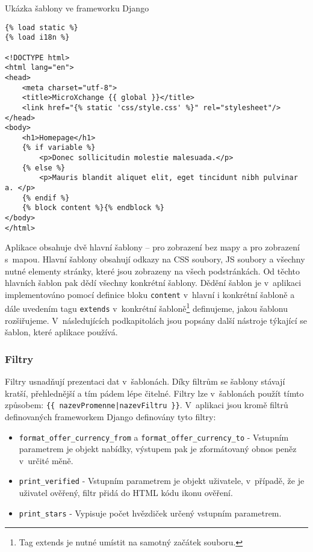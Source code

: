 \begin{listing}[htbp]
\caption{\label{code:django-template}Ukázka šablony ve frameworku Django}
\begin{verbatim}
{% load static %}
{% load i18n %}

<!DOCTYPE html>
<html lang="en">
<head>
    <meta charset="utf-8">
    <title>MicroXchange {{ global }}</title>
    <link href="{% static 'css/style.css' %}" rel="stylesheet"/>
</head>
<body>
    <h1>Homepage</h1>
    {% if variable %}
        <p>Donec sollicitudin molestie malesuada.</p>
    {% else %}
        <p>Mauris blandit aliquet elit, eget tincidunt nibh pulvinar a. </p>
    {% endif %}
    {% block content %}{% endblock %}
</body>
</html>
\end{verbatim}
\end{listing}

Aplikace obsahuje dvě hlavní šablony -- pro zobrazení bez mapy a pro zobrazení s~mapou. Hlavní šablony obsahují odkazy na CSS soubory, JS soubory a všechny nutné elementy stránky, které jsou zobrazeny na všech podstránkách. Od těchto hlavních šablon pak dědí všechny konkrétní šablony. Dědění šablon je v~aplikaci implementováno pomocí definice bloku \texttt{content} v~hlavní i konkrétní šabloně a dále uvedením tagu \texttt{extends} v~konkrétní šabloně\footnote{Tag extends je nutné umístit na samotný začátek souboru.} definujeme, jakou šablonu rozšiřujeme. V~následujících podkapitolách jsou popsány další nástroje týkající se šablon, které aplikace používá.

\subsubsection{Filtry}
Filtry usnadňují prezentaci dat v~šablonách. Díky filtrům se šablony stávají kratší, přehlednější a tím pádem lépe čitelné. Filtry lze v~šablonách použít tímto způsobem: \mbox{\texttt{\{\{ nazevPromenne|nazevFiltru \}\}}}. V~aplikaci jsou kromě filtrů definovaných frameworkem Django definovány tyto filtry:
\begin{itemize}
    \item \texttt{format\_offer\_currency\_from} a \texttt{format\_offer\_currency\_to} - Vstupním parametrem je objekt nabídky, výstupem pak je zformátovaný obnos peněz v~určité měně.
    \item \texttt{print\_verified} - Vstupním parametrem je objekt uživatele, v~případě, že je uživatel ověřený, filtr přidá do HTML kódu ikonu ověření.
    \item \texttt{print\_stars} - Vypisuje počet hvězdiček určený vstupním parametrem.
\end{itemize}

